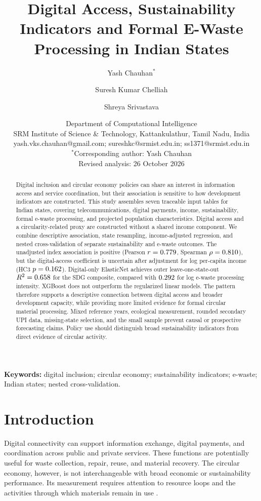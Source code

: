 \documentclass[11pt,a4paper]{article}
\title{Digital Access, Sustainability Indicators and Formal E-Waste Processing in Indian States}
\author{Yash Chauhan$^{*}$ \and Suresh Kumar Chelliah \and Shreya Srivastava}
\date{\small Department of Computational Intelligence\\
SRM Institute of Science \& Technology, Kattankulathur, Tamil Nadu, India\\[3pt]
\footnotesize yash.vks.chauhan@gmail.com; sureshkc@srmist.edu.in; ss1371@srmist.edu.in\\[3pt]
\footnotesize $^{*}$Corresponding author: Yash Chauhan\\[5pt]
\small Revised analysis: 26 October 2026}
\begin{document}
\maketitle
\begin{abstract}
Digital inclusion and circular economy policies can share an interest in information access and service coordination, but their association is sensitive to how development indicators are constructed. This study assembles seven traceable input tables for \SampleN{} Indian states, covering telecommunications, digital payments, income, sustainability, formal e-waste processing, and projected population characteristics. Digital access and a circularity-related proxy are constructed without a shared income component. We combine descriptive association, state resampling, income-adjusted regression, and nested cross-validation of separate sustainability and e-waste outcomes. The unadjusted index association is positive (Pearson $r=0.779{}$, Spearman $\rho=0.810{}$), but the digital-access coefficient is uncertain after adjustment for log per-capita income (HC3 $p=0.162{}$). Digital-only ElasticNet achieves outer leave-one-state-out $R^2=0.658{}$ for the SDG composite, compared with $0.292{}$ for log e-waste processing intensity. XGBoost does not outperform the regularized linear models. The pattern therefore supports a descriptive connection between digital access and broader development capacity, while providing more limited evidence for formal circular material processing. Mixed reference years, ecological measurement, rounded secondary UPI data, missing-state selection, and the small sample prevent causal or prospective forecasting claims. Policy use should distinguish broad sustainability indicators from direct evidence of circular activity.
\end{abstract}
\textbf{Keywords:} digital inclusion; circular economy; sustainability indicators; e-waste; Indian states; nested cross-validation.

\section{Introduction}
Digital connectivity can support information exchange, digital payments, and coordination across public and private services. These functions are potentially useful for waste collection, repair, reuse, and material recovery. The circular economy, however, is not interchangeable with broad economic or sustainability performance. Its measurement requires attention to resource loops and the activities through which materials remain in use \cite{geissdoerfer}.
\end{document}
